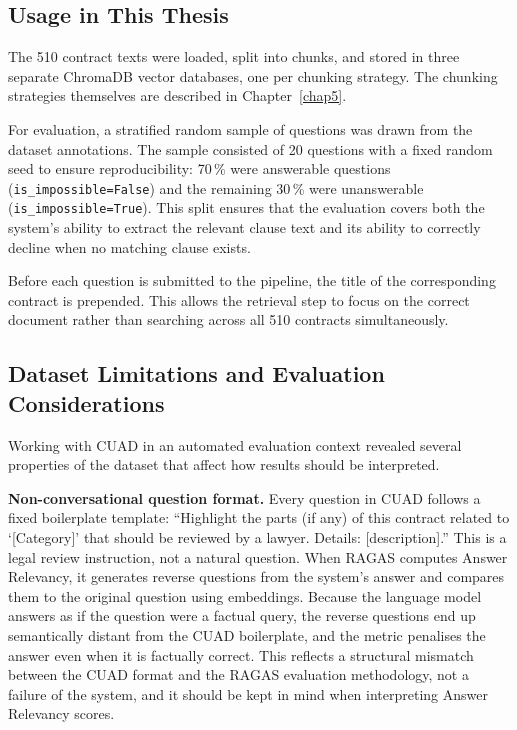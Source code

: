 \subsection{Usage in This Thesis}
\label{sec:question-sampling}
The 510 contract texts were loaded, split into chunks, and stored in three separate ChromaDB vector databases, one per chunking strategy. The chunking strategies themselves are described in
Chapter~\ref{chap5}.

For evaluation, a stratified random sample of questions was drawn from the dataset
annotations. The sample consisted of 20 questions with a fixed random seed to ensure
reproducibility: 70\,\% were answerable questions (\texttt{is\_impossible=False}) and the remaining
30\,\% were unanswerable (\texttt{is\_impossible=True}). This split ensures that the
evaluation covers both the system's ability to extract the relevant clause text and its
ability to correctly decline when no matching clause exists.

Before each question is submitted to the pipeline, the title of the corresponding
contract is prepended. This allows the retrieval step to focus on the correct
document rather than searching across all 510 contracts simultaneously.

\subsection{Dataset Limitations and Evaluation Considerations}

Working with CUAD in an automated evaluation context revealed several properties of
the dataset that affect how results should be interpreted.

\textbf{Non-conversational question format.}
Every question in CUAD follows a fixed boilerplate template: ``Highlight the
parts (if any) of this contract related to `[Category]' that should be reviewed by a
lawyer. Details: [description].'' This is a legal review instruction, not a natural
question. When RAGAS computes Answer Relevancy, it generates reverse questions from
the system's answer and compares them to the original question using embeddings.
Because the language model answers as if the question were a factual query, the
reverse questions end up semantically distant from the CUAD boilerplate, and the
metric penalises the answer even when it is factually correct. This reflects a
structural mismatch between the CUAD format and the RAGAS evaluation methodology,
not a failure of the system, and it should be kept in mind when interpreting Answer
Relevancy scores.

